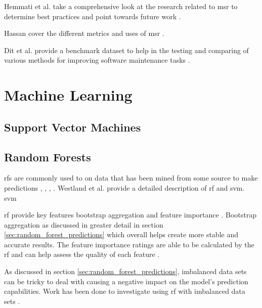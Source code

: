 Hemmati et al. take a comprehensive look at the research related to \gls{msr} to determine best practices and point towards future work \cite{Hemmati2013}.

Hassan cover the different metrics and uses of \gls{msr} \cite{Hassan2006}.

Dit et al. provide a benchmark dataset to help in the testing and comparing of various methods for improving software maintenance tasks \cite{Dit2013}.


\section{Machine Learning}

\subsection{Support Vector Machines}


\subsection{Random Forests}


\gls{rf}s are commonly used to on data that has been mined from some source to make predictions \cite{Alam2013}, \cite{Granitto2007}, \cite{Stojanova}, \cite{Yu2011}. Westland et al. provide a detailed description of \gls{rf} and \gls{svm}. \gls{svm} %

\gls{rf} provide key features bootstrap aggregation and feature importance \cite{Westland2011}. Bootstrap aggregation as discussed in greater detail in section \ref{sec:random_forest_predictions} which overall helps create more stable and accurate results. The feature importance ratings are able to be calculated by the \gls{rf} and can help assess the quality of each feature \cite{Verikas2011}.

As discussed in section \ref{sec:random_forest_predictions}, imbalanced data sets can be tricky to deal with causing a negative impact on the model's prediction capabilities. Work has been done to investigate using \gls{rf} with imbalanced data sets \cite{Khoshgoftaar2007}. %


